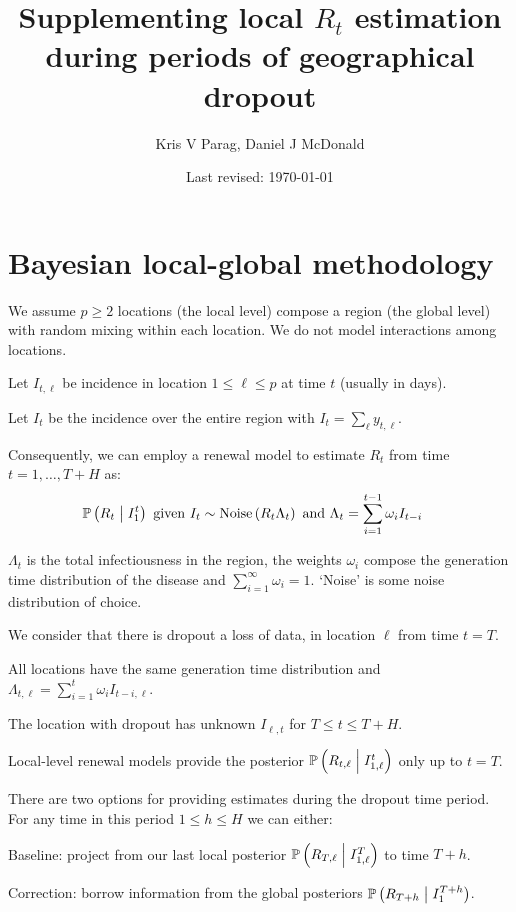 \documentclass[12pt]{article}
\title{\huge Supplementing local $R_t$ estimation during periods of geographical dropout}
\author{Kris V Parag, Daniel J McDonald}
\date{Last revised: \today}
\newcommand{\cond}{\; \m| \;}
\begin{document}
\maketitle


\section*{Bayesian local-global methodology}\label{sec:bayes}

We assume $p\geq 2$ locations (the local level) compose a region (the global level) with random mixing within each location. We do not model interactions among locations.

\bitem
\item Let $I_{t, \ell}$ be incidence in location $1\leq \ell \leq p$ at time $t$
(usually in days).
\item Let $I_t$ be the incidence over the entire region with $I_t = \sum_{\ell}
y_{t, \ell}$. 
\eitem

Consequently, we can employ a renewal model to estimate $R_t$ from time $t=1,\ldots, T + H$ as:
\begin{align}
& \mathbb{P}\left(R_t \cond I_1^{t}\right) \text{ given } I_t \sim \text{Noise} 
\left(R_t\Lambda_t\right) \text{ and } \Lambda_t = \sum_{i=1}^{t-1}
\omega_{i}I_{t-i}\label{eq: 1}
\end{align}


$\Lambda_t$ is the total infectiousness in the region, the weights $\omega_{i}$
compose the generation time distribution of the disease and
$\sum_{i=1}^{\infty}\omega_{i} = 1$. `Noise' is some noise distribution of
choice. 

We consider that there is dropout \ie a loss of data, in location $\ell$ from
time $t=T$.

\bitem
\item All locations have the same generation time distribution and $\Lambda_{t,
\ell} =\sum_{i=1}^{t} \omega_{i}I_{t-i, \ell}$.
\item The location with dropout has unknown $I_{\ell,t}$ for $T \leq t \leq T+H$.
\item Local-level renewal models provide the posterior $\mathbb{P}\left(R_{t,
\ell}  \cond I_{1, \ell}^{t}\right)$ only up to $t = T$.
\eitem

There are two options for providing estimates during the dropout time period.
For any time in this period $1 \leq h \leq H$ we can either:
\benum
\item Baseline: project from our last local posterior $\mathbb{P}\left(R_{T, \ell}  \cond I_{1, \ell}^{T}\right)$ to time $T+h$.
\item Correction: borrow information from the global posteriors $\mathbb{P}\left(R_{T+h}  \cond I_{1}^{T+h}\right)$.
\eenum
\end{document}
